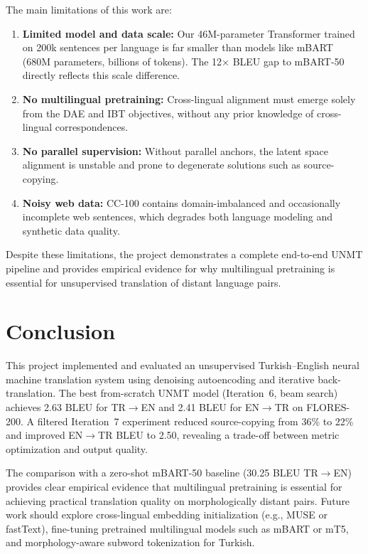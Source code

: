 \documentclass[runningheads]{llncs}
\begin{document}
The main limitations of this work are:
\begin{enumerate}
    \item \textbf{Limited model and data scale:} Our 46M-parameter Transformer trained on 200k sentences per language is far smaller than models like mBART (680M parameters, billions of tokens). The 12$\times$ BLEU gap to mBART-50 directly reflects this scale difference.
    \item \textbf{No multilingual pretraining:} Cross-lingual alignment must emerge solely from the DAE and IBT objectives, without any prior knowledge of cross-lingual correspondences.
    \item \textbf{No parallel supervision:} Without parallel anchors, the latent space alignment is unstable and prone to degenerate solutions such as source-copying.
    \item \textbf{Noisy web data:} CC-100 contains domain-imbalanced and occasionally incomplete web sentences, which degrades both language modeling and synthetic data quality.
\end{enumerate}

Despite these limitations, the project demonstrates a complete end-to-end UNMT pipeline and provides empirical evidence for why multilingual pretraining is essential for unsupervised translation of distant language pairs.

\section{Conclusion}

This project implemented and evaluated an unsupervised Turkish--English neural machine translation system using denoising autoencoding and iterative back-translation. The best from-scratch UNMT model (Iteration~6, beam search) achieves 2.63 BLEU for TR$\rightarrow$EN and 2.41 BLEU for EN$\rightarrow$TR on FLORES-200. A filtered Iteration~7 experiment reduced source-copying from 36\% to 22\% and improved EN$\rightarrow$TR BLEU to 2.50, revealing a trade-off between metric optimization and output quality.

The comparison with a zero-shot mBART-50 baseline (30.25 BLEU TR$\rightarrow$EN) provides clear empirical evidence that multilingual pretraining is essential for achieving practical translation quality on morphologically distant pairs. Future work should explore cross-lingual embedding initialization (e.g., MUSE or fastText), fine-tuning pretrained multilingual models such as mBART or mT5, and morphology-aware subword tokenization for Turkish.
\end{document}
